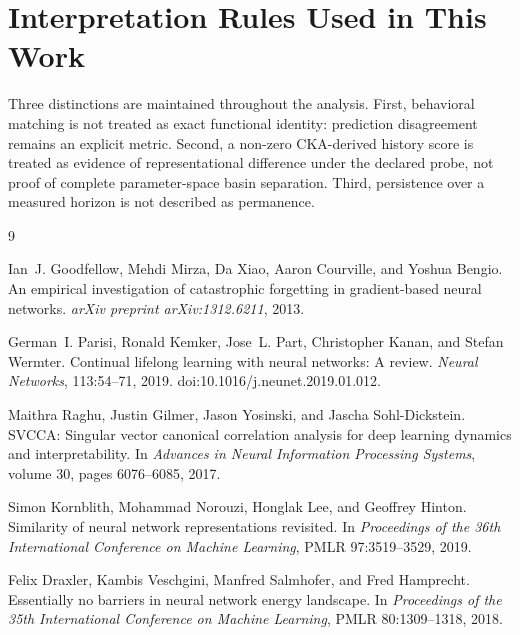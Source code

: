 \documentclass[11pt,a4paper]{article}
\begin{document}
\section{Interpretation Rules Used in This Work}
Three distinctions are maintained throughout the analysis. First, behavioral matching is not treated as exact functional identity: prediction disagreement remains an explicit metric. Second, a non-zero CKA-derived history score is treated as evidence of representational difference under the declared probe, not proof of complete parameter-space basin separation. Third, persistence over a measured horizon is not described as permanence.

\footnotesize
\begin{thebibliography}{9}

Ian~J. Goodfellow, Mehdi Mirza, Da Xiao, Aaron Courville, and Yoshua Bengio.
\newblock An empirical investigation of catastrophic forgetting in gradient-based neural networks.
\newblock \emph{arXiv preprint arXiv:1312.6211}, 2013.

German~I. Parisi, Ronald Kemker, Jose~L. Part, Christopher Kanan, and Stefan Wermter.
\newblock Continual lifelong learning with neural networks: A review.
\newblock \emph{Neural Networks}, 113:54--71, 2019. doi:10.1016/j.neunet.2019.01.012.

Maithra Raghu, Justin Gilmer, Jason Yosinski, and Jascha Sohl-Dickstein.
\newblock SVCCA: Singular vector canonical correlation analysis for deep learning dynamics and interpretability.
\newblock In \emph{Advances in Neural Information Processing Systems}, volume 30, pages 6076--6085, 2017.

Simon Kornblith, Mohammad Norouzi, Honglak Lee, and Geoffrey Hinton.
\newblock Similarity of neural network representations revisited.
\newblock In \emph{Proceedings of the 36th International Conference on Machine Learning}, PMLR 97:3519--3529, 2019.

Felix Draxler, Kambis Veschgini, Manfred Salmhofer, and Fred Hamprecht.
\newblock Essentially no barriers in neural network energy landscape.
\newblock In \emph{Proceedings of the 35th International Conference on Machine Learning}, PMLR 80:1309--1318, 2018.


\end{thebibliography}
\end{document}
